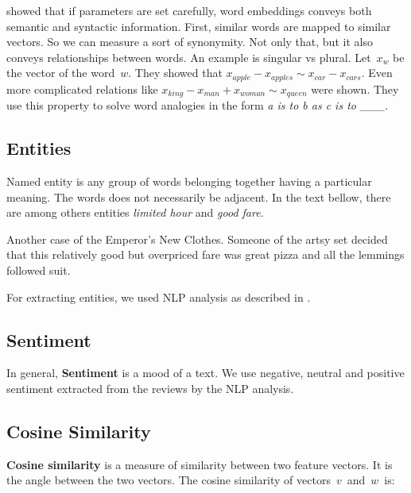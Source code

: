 \citet{Mik13} showed that if parameters are set carefully, word embeddings conveys both semantic and syntactic information.
First, similar words are mapped to similar vectors. So we can measure a sort of synonymity.
Not only that, but it also conveys relationships between words.
An example is singular vs plural.
Let~$x_{w}$ be the vector of the word~$w$.
They showed that $x_{apple}-x_{apples} \sim x_{car}-x_{cars}$.
Even more complicated relations like $x_{king} - x_{man} + x_{woman} \sim x_{queen}$ were shown.
They use this property to solve word analogies in the form {\it a is to b as c is to \_\_\_}.


\subsection{Entities}

Named entity is any group of words belonging together having a particular meaning.
The words does not necessarily be adjacent.
In the text bellow, there are among others entities \textit{limited hour} and \textit{good fare}.

\begin{code}
Another case of the Emperor's New Clothes.
Someone of the artsy set decided that this relatively good
but overpriced fare was great pizza and all the lemmings followed suit.
\end{code}

For extracting entities, we used NLP analysis as described in .



\subsection{Sentiment}

In general, \textbf{Sentiment} is a mood of a text.
We use negative, neutral and positive sentiment extracted from the reviews by the NLP analysis.

\subsection{Cosine Similarity}

\textbf{Cosine similarity} is a measure of similarity between two feature vectors.
It is the angle between the two vectors.
The cosine similarity of vectors~$v$~and~$w$~is:

